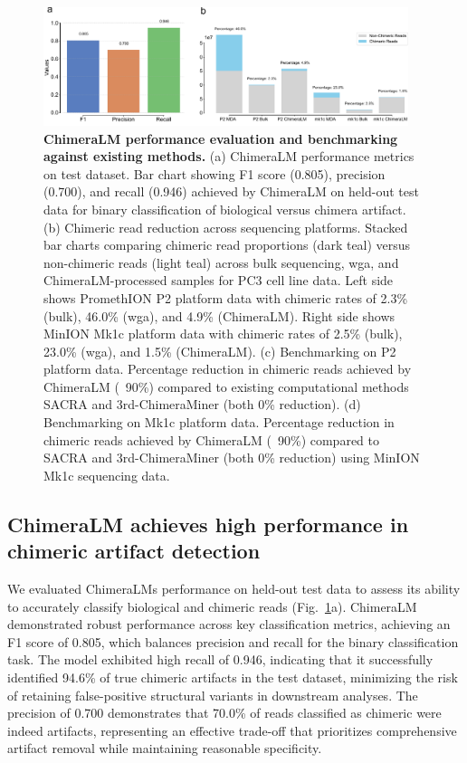 \documentclass[pdflatex,sn-nature]{sn-jnl}%
\theoremstyle{thmstyleone}%
\theoremstyle{thmstyletwo}%
\theoremstyle{thmstylethree}%
\begin{document}
\begin{figure}[!ht]
	\begin{center}
		\includegraphics[width=0.95\textwidth]{final_figures/figure2}
	\end{center}
	\caption{{\bf ChimeraLM performance evaluation and benchmarking against existing methods.}
		(a) ChimeraLM performance metrics on test dataset. Bar chart showing F1 score (0.805), precision (0.700), and recall (0.946) achieved by ChimeraLM on held-out test data for binary classification of biological versus chimera artifact.
		(b) Chimeric read reduction across sequencing platforms. Stacked bar charts comparing chimeric read proportions (dark teal) versus non-chimeric reads (light teal) across bulk sequencing, \gls{wga}, and ChimeraLM-processed samples for PC3 cell line data. Left side shows PromethION P2 platform data with chimeric rates of 2.3\% (bulk), 46.0\% (\gls{wga}), and 4.9\% (ChimeraLM). Right side shows MinION Mk1c platform data with chimeric rates of 2.5\% (bulk), 23.0\% (\gls{wga}), and 1.5\% (ChimeraLM).
		(c) Benchmarking on P2 platform data. Percentage reduction in chimeric reads achieved by ChimeraLM (~90\%) compared to existing computational methods SACRA and 3rd-ChimeraMiner (both 0\% reduction).
		(d) Benchmarking on Mk1c platform data. Percentage reduction in chimeric reads achieved by ChimeraLM (~90\%) compared to SACRA and 3rd-ChimeraMiner (both 0\% reduction) using MinION Mk1c sequencing data.
	}\label{fig:figure2}
\end{figure}

\subsection*{ChimeraLM achieves high performance in chimeric artifact detection}

We evaluated ChimeraLM\textquotesingle s performance on held-out test data to assess its ability to accurately classify biological and chimeric reads (Fig.~\ref{fig:figure2}a).
ChimeraLM demonstrated robust performance across key classification metrics, achieving an F1 score of 0.805, which balances precision and recall for the binary classification task.
The model exhibited high recall of 0.946, indicating that it successfully identified 94.6\% of true chimeric artifacts in the test dataset, minimizing the risk of retaining false-positive structural variants in downstream analyses.
The precision of 0.700 demonstrates that 70.0\% of reads classified as chimeric were indeed artifacts, representing an effective trade-off that prioritizes comprehensive artifact removal while maintaining reasonable specificity.
\end{document}
